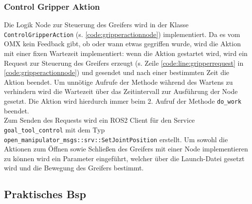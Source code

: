 \subsubsection{Control Gripper Aktion}
Die Logik Node zur Steuerung des Greifers wird in der Klasse \verb|ControlGripperAction| (s. \ref{code:gripperactionnode}) implementiert. Da es vom OMX kein Feedback gibt, ob oder wann etwas gegriffen wurde, wird die Aktion mit einer fixen Wartezeit implementiert: wenn die Aktion gestartet wird, wird ein Request zur Steuerung des Greifers erzeugt (s. Zeile \ref{code:line:gripperrequest} in \ref{code:gripperactionnode}) und gesendet und nach einer bestimmten Zeit die Aktion beendet. Um unnötige Aufrufe der Methode während des Wartens zu verhindern wird die Wartezeit über das Zeitintervall zur Ausführung der Node gesetzt. Die Aktion wird hierdurch immer beim 2. Aufruf der Methode \verb|do_work| beendet.\\
Zum Senden des Requests wird ein \ac{ROS2} Client für den Service \verb|goal_tool_control| mit dem Typ \verb|open_manipulator_msgs::srv::SetJointPosition| erstellt. 
Um sowohl die Aktionen zum Öffnen sowie Schließen des Greifers mit einer Node implementieren zu können wird ein Parameter eingeführt, welcher über die Launch-Datei gesetzt wird und die Bewegung des Greifers bestimmt.
\subsection{Praktisches Bsp}

